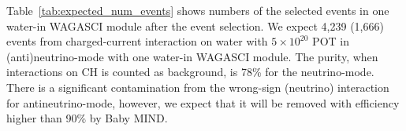Table~\ref{tab:expected_num_events}  shows numbers of the selected events in one water-in WAGASCI module after the event selection.
We expect 4,239 (1,666) events from charged-current interaction on water with $5 \times 10^{20}$  POT in (anti)neutrino-mode with one water-in WAGASCI module.
The purity, when interactions on CH is counted as background, is 78\% for the neutrino-mode.
There is a significant contamination from the wrong-sign (neutrino) interaction for antineutrino-mode, however, we expect that
it will be removed with efficiency higher than 90\% by Baby MIND.
